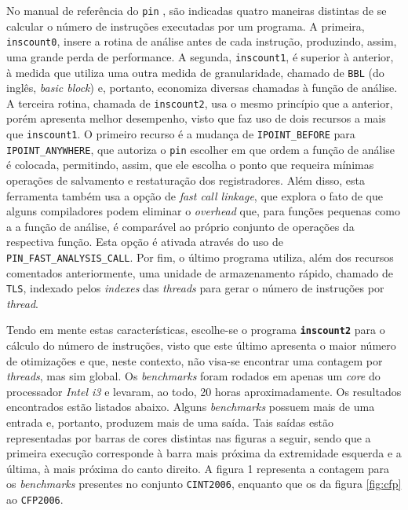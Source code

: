 \documentclass[12pt]{article}
\begin{document}
No manual de referência do \texttt{pin}  \cite{Intel:12}, são indicadas quatro
maneiras distintas de se calcular o número de instruções executadas por um programa. A primeira,
\texttt{inscount0}, insere a rotina de análise antes de cada instrução,
produzindo, assim, uma grande perda de performance. A segunda,
\texttt{inscount1}, é superior à anterior, à medida que utiliza uma outra medida
de granularidade, chamado de \texttt{BBL} (do inglês, \textit{basic block}) e,
portanto, economiza diversas chamadas à função de análise. A terceira rotina,
chamada de \texttt{inscount2}, usa o mesmo princípio que a anterior, porém
apresenta melhor desempenho, visto que faz uso de dois recursos a mais que
\texttt{inscount1}. O primeiro recurso é a mudança de \texttt{IPOINT\_BEFORE}
para \texttt{IPOINT\_ANYWHERE}, que autoriza o \texttt{pin} escolher em que
ordem a função de análise é colocada, permitindo, assim, que ele escolha o ponto
que requeira mínimas operações de salvamento e restaturação dos registradores.
Além disso, esta ferramenta também usa a opção de \textit{fast call linkage},
que explora o fato de que alguns compiladores podem eliminar o
\textit{overhead} que, para funções pequenas como a a função de análise, é
comparável ao próprio conjunto de operações da respectiva função. Esta opção é
ativada através do uso de \texttt{PIN\_FAST\_ANALYSIS\_CALL}. Por fim, o último
programa utiliza, além dos recursos comentados anteriormente, uma unidade de
armazenamento rápido, chamado de \texttt{TLS}, indexado pelos \textit{indexes}
das \textit{threads} para gerar o número de instruções por \textit{thread}. 

Tendo em mente estas características, escolhe-se o programa
\textbf{\texttt{inscount2}} para o cálculo do número de instruções, visto que
este último apresenta o maior número de otimizações e que, neste contexto, não
visa-se encontrar uma contagem por \textit{threads}, mas sim global. Os
\textit{benchmarks} foram rodados em apenas um \textit{core} do processador
\textit{Intel i3} e levaram, ao todo, 20 horas aproximadamente. Os resultados
encontrados estão listados abaixo. Alguns \textit{benchmarks} possuem mais de
uma entrada e, portanto, produzem mais de uma saída. Tais saídas estão
representadas por barras de cores distintas nas figuras a seguir, sendo que a
primeira execução corresponde à barra mais próxima da extremidade esquerda e a
última, à mais próxima do canto direito.
A figura 1 representa a contagem para os \textit{benchmarks} presentes no
conjunto \texttt{CINT2006}, enquanto que os da figura \ref{fig:cfp} ao \texttt{CFP2006}.
\end{document}

